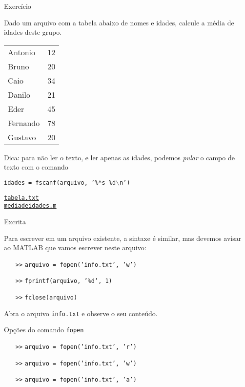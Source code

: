 \documentclass[hyperref={pdfpagelabels=false}]{beamer}
\begin{document}
\begin{frame}{Exercício}

  Dado um arquivo com a tabela abaixo de nomes e idades, calcule a média de idades deste grupo.
  \begin{center}{\footnotesize{%
    \begin{tabular}{l r}
      Antonio & 12\\
      Bruno & 20\\
      Caio & 34\\
      Danilo & 21\\
      Eder & 45\\
      Fernando & 78\\
      Gustavo & 20
    \end{tabular}}}
  \end{center}

  Dica: para não ler o texto, e ler apenas as idades, podemos \emph{pular} o campo de texto com o comando

  \begin{center}
    \texttt{idades = fscanf(arquivo, '\%\alert{*}s \%d$\backslash$n')}
  \end{center}

  \begin{center}
    \href{listings/tabela.txt}{\underline{\texttt{tabela.txt}}}\\
    \href{listings/mediadeidades.m}{\underline{\texttt{mediadeidades.m}}}
  \end{center}
\end{frame}

\begin{frame}{Excrita}

  Para escrever em um arquivo existente, a sintaxe é similar, mas devemos avisar ao MATLAB que vamos escrever neste arquivo:
  \vfill

  \begin{itemize}
  \item[\texttt{>>}] \texttt{arquivo = fopen('info.txt', \alert{'w'})}
  \item[\texttt{>>}] \texttt{fprintf(arquivo, '\%d', 1)}
  \item[\texttt{>>}] \texttt{fclose(arquivo)}
  \end{itemize}

  Abra o arquivo \texttt{info.txt} e observe o seu conteúdo.
  
\end{frame}

\begin{frame}{Opções do comando \texttt{fopen}}

  \begin{itemize}
  \item[\texttt{>>}] \texttt{arquivo = fopen('info.txt', \alert{'r'})}
  \item[\texttt{>>}] \texttt{arquivo = fopen('info.txt', \alert{'w'})}
  \item[\texttt{>>}] \texttt{arquivo = fopen('info.txt', \alert{'a'})}
  \end{itemize}
  
\end{frame}
\end{document}
